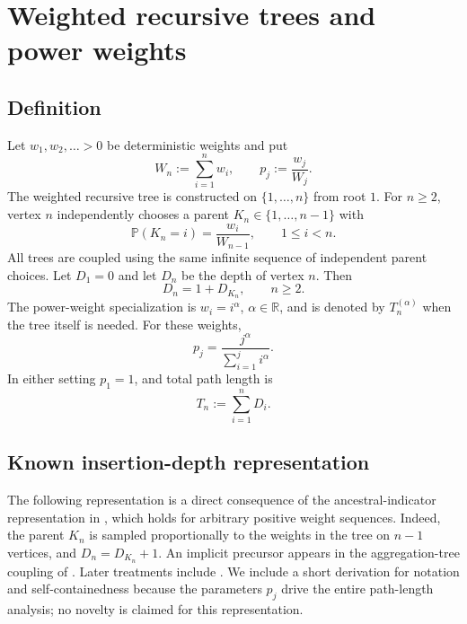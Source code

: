 \documentclass[11pt,a4paper]{article}
\newcommand{\Pp}{\mathbb{P}}
\newcommand{\1}{\mathbf{1}}
\newcommand{\R}{\mathbb{R}}
\begin{document}
\section{Weighted recursive trees and power weights}\label{sec:model}

\subsection{Definition}
Let $w_1,w_2,\ldots>0$ be deterministic weights and put
\[
W_n:=\sum_{i=1}^n w_i,\qquad p_j:=\frac{w_j}{W_j}.
\]
The weighted recursive tree is constructed on $\{1,\ldots,n\}$ from root $1$.
For $n\ge2$, vertex $n$ independently chooses a parent $K_n\in\{1,\ldots,n-1\}$ with
\begin{equation}\label{eq:parent-law}
\Pp(K_n=i)=\frac{w_i}{W_{n-1}},\qquad 1\le i<n.
\end{equation}
All trees are coupled using the same infinite sequence of independent parent choices.
Let $D_1=0$ and let $D_n$ be the depth of vertex $n$. Then
\begin{equation}\label{eq:depth-rec}
D_n=1+D_{K_n},\qquad n\ge2.
\end{equation}
The power-weight specialization is $w_i=i^\alpha$, $\alpha\in\R$, and is denoted by $T_n^{(\alpha)}$ when the tree itself is needed.
For these weights,
\begin{equation}\label{eq:pj}
p_j=\frac{j^\alpha}{\sum_{i=1}^j i^\alpha}.
\end{equation}
In either setting $p_1=1$, and total path length is
\begin{equation}\label{eq:Tn}
T_n:=\sum_{i=1}^nD_i.
\end{equation}

\subsection{Known insertion-depth representation}

The following representation is a direct consequence of the
ancestral-indicator representation in
\citet[Corollary~8]{MaillerUribeBravo2019}, which holds for arbitrary positive
weight sequences.  Indeed, the parent $K_n$ is sampled proportionally to the
weights in the tree on $n-1$ vertices, and $D_n=D_{K_n}+1$.  An implicit
precursor appears in the aggregation-tree coupling of
\citet[equation~(2.2)]{CurienHaas2017}.  Later treatments include
\citet{Senizergues2021,LyonMahmoud2022,NakataMahmoud2024}.  We include a short
derivation for notation and self-containedness because the parameters $p_j$
drive the entire path-length analysis; no novelty is claimed for this
representation.
\end{document}
